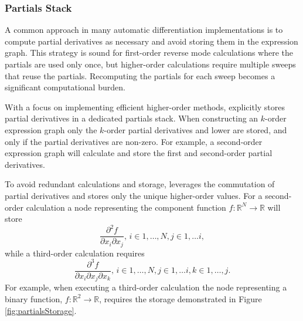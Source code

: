 \subsubsection{Partials Stack}

A common approach in many automatic differentiation implementations
is to compute partial derivatives as necessary and avoid storing them
in the expression graph.  This strategy is sound for first-order reverse
mode calculations where the partials are used only once, but higher-order
calculations require multiple sweeps that reuse the partials.  Recomputing
the partials for each sweep becomes a significant computational burden.

With a focus on implementing efficient higher-order methods, \nomad 
explicitly stores partial derivatives in a dedicated partials stack.  When 
constructing an $k$-order expression graph only the $k$-order partial 
derivatives and lower are stored, and only if the partial derivatives are 
non-zero.  For example, a second-order expression graph will calculate 
and store the first and second-order partial derivatives.

To avoid redundant calculations and storage, \nomad leverages the 
commutation of partial derivatives and stores only the unique higher-order 
values.  For a second-order calculation a node representing the component 
function $f: \mathbb{R}^{N} \rightarrow \mathbb{R}$ will store
%
\begin{equation*}
\frac{ \partial^{2} f }{ \partial x_{i} \partial x_{j} }, \, i \in 1, \ldots, N, j \in 1, \ldots i,
\end{equation*}
%
while a third-order calculation requires
%
\begin{equation*}
\frac{ \partial^{3} f }{ \partial x_{i} \partial x_{j} \partial x_{k} }, \, 
i \in 1, \ldots, N, j \in 1, \ldots i, k \in 1, \ldots, j.
\end{equation*}
%
For example, when executing a third-order calculation the node representing
a binary function, $f : \mathbb{R}^{2} \rightarrow \mathbb{R}$, requires
the storage demonstrated in Figure \ref{fig:partialsStorage}.

